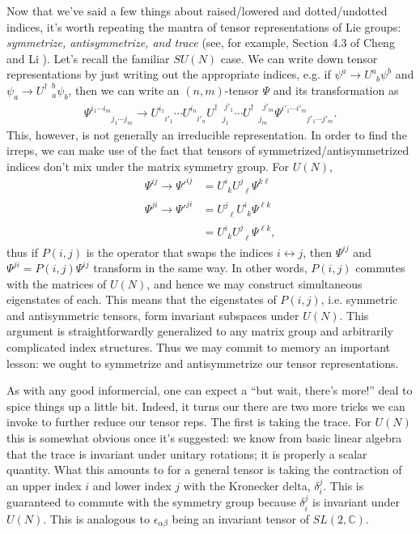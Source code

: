 \documentclass[12pt, oneside]{report}    %
\begin{document}
Now that we've said a few things about raised/lowered and dotted/undotted indices, it's worth repeating the mantra of tensor representations of Lie groups: \textit{symmetrize, antisymmetrize, and trace} (see, for example, Section 4.3 of Cheng and Li \cite{chengandli}). Let's recall the familiar $SU(N)$ case. We can write down tensor representations by just writing out the appropriate indices, e.g. if $\psi^a \to U^a_{\phantom a b}\psi^b$ and $\psi_a \to U^{\dag\phantom a b}_{\phantom\dag a}\psi_b$, then we can write an $(n,m)$-tensor $\Psi$ and its transformation as
    \begin{align}
        \Psi^{i_1\cdots i_m}_{\phantom{i_1\cdots i_m}j_1\cdots j_m} \to U^{i_1}_{\phantom{i_1}i'_1}\cdots U^{i_n}_{\phantom{i_n}i'_n} U^{\dag\phantom{j_1} j'_1}_{\phantom\dag j_1}\cdots U^{\dag\phantom{j_m} j'_m}_{\phantom\dag j_m} \Psi^{i'_1\cdots i'_m}_{\phantom{i'_1\cdots i'_m}j'_1\cdots j'_m}.
    \end{align} 
This, however, is not generally an irreducible representation. In order to find the irreps, we can make use of the fact that tensors of symmetrized/antisymmetrized indices don't mix under the matrix symmetry group. For $U(N)$,
\begin{align}
    \Psi^{ij}\to \Psi'^{ij} &= U^i_{\phantom i k} U^j_{\phantom j \ell} \Psi^{k\ell}\\
    \Psi^{ji}\to \Psi'^{ji} &= U^j_{\phantom j \ell} U^i_{\phantom i k} \Psi^{\ell k}\\
    &= U^i_{\phantom i k} U^j_{\phantom j \ell} \Psi^{\ell k},
\end{align}
thus if $P(i,j)$ is the operator that swaps the indices $i \leftrightarrow j$, then $\Psi^{ij}$ and $\Psi^{ji} = P(i,j)\Psi^{ij}$ transform in the same way. In other words, $P(i,j)$ commutes with the matrices of $U(N)$, and hence we may construct simultaneous eigenstates of each. This means that the eigenstates of $P(i,j)$, i.e. symmetric and antisymmetric tensors, form invariant subspaces under $U(N)$. This argument is straightforwardly generalized to any matrix group and arbitrarily complicated index structures. Thus we may commit to memory an important lesson: we ought to symmetrize and antisymmetrize our tensor representations. 

As with any good informercial, one can expect a ``but wait, there's more!'' deal to spice things up a little bit. Indeed, it turns our there are two more tricks we can invoke to further reduce our tensor reps. The first is taking the trace. For  $U(N)$ this is somewhat obvious once it's suggested: we know from basic linear algebra that the trace is invariant under unitary rotations; it is properly a scalar quantity. What this amounts to for a general tensor is taking the contraction of an upper index $i$ and lower index $j$ with the Kronecker delta, $\delta^j_i$. This is guaranteed to commute with the symmetry group because $\delta^j_i$ is invariant under $U(N)$. This is analogous to $\epsilon_{\alpha\beta}$ being an invariant tensor of $SL(2,\mathbb{C})$.
\end{document}
